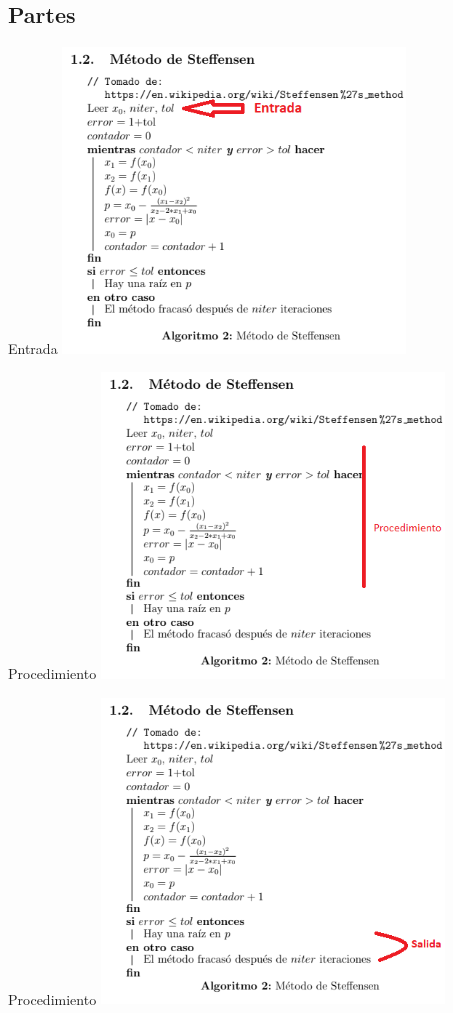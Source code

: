 \documentclass[usenames, dvipsnames, compress]{beamer}
\begin{document}
	\subsection{Partes}
	\begin{frame}{Entrada}
		\includegraphics[height=230pt]{images/entrada.png}
	\end{frame}
	\begin{frame}{Procedimiento}
		\includegraphics[height=230pt]{images/procedimiento.png}
	\end{frame}
	\begin{frame}{Procedimiento}
		\includegraphics[height=230pt]{images/salida.png}
	\end{frame}
\end{document}
